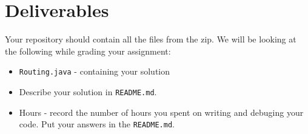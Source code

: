 \documentclass[12pt]{article}
\begin{document}
\section{Deliverables}

Your repository should contain all the files from the zip.  We will be
looking at the following while grading your assignment:
\begin{itemize}
\item \texttt{Routing.java} - containing your solution
\item Describe your solution in \texttt{README.md}.
\item Hours - record the number of hours you spent on writing and
  debuging your code. Put your answers in the \texttt{README.md}.
\end{itemize}
\end{document}
